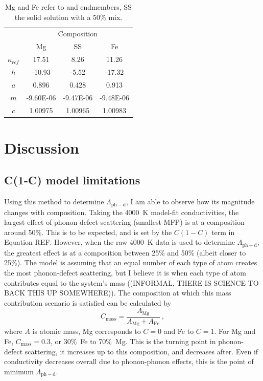 \begin{table}[h]
\centering
\caption[CONTENTS BIT]{\label{tab:comp-table}Mg and Fe refer to \mgsios and \fesios endmembers, SS the solid solution with a 50\% mix.}
\begin{tabular}{c|ccc}
                           & \multicolumn{3}{c}{Composition}    \\
                           & Mg             & SS           & Fe           \\ \hline
$\kappa_{ref}$  & 17.51         & 8.26        & 11.26      \\
$h$                     & -10.93        & -5.52       & -17.32     \\
$a$                     & 0.896         & 0.428       & 0.913     \\
$m$                    & -9.60E-06  & -9.47E-06 & -9.48E-06 \\
$c$                      & 1.00975    & 1.00965    & 1.00983
\end{tabular}
\end{table}







\section{Discussion} 

\subsection{C(1-C) model limitations}

Using this method to determine $\Lambda_{\mathrm{ph-d}}$, I am able to observe how its magnitude changes with composition. Taking the 4000~K model-fit conductivities, the largest effect of phonon-defect scattering (smallest MFP) is at a composition around 50\%. This is to be expected, and is set by the $C \left (1-C \right)$ term in Equation REF. However, when the raw 4000~K data is used to determine $\Lambda_{\mathrm{ph-d}}$, the greatest effect is at a composition between 25\% and 50\% (albeit closer to 25\%). The model is assuming that an equal number of each type of atom creates the most phonon-defect scattering, but I believe it is when each type of atom contributes equal to the system's mass ((INFORMAL, THERE IS SCIENCE TO BACK THIS UP SOMEWHERE)). The composition at which this mass contribution scenario is satisfied can be calculated by
%
$$ C_{\mathrm{mass}} = \frac{A_{\mathrm{Mg}}}{A_{\mathrm{Mg}} + A_{\mathrm{Fe}}}\ ,$$
%
where $A$ is atomic mass, Mg corresponds to $C=0$ and Fe to $C=1$. For Mg and Fe, $C_{\mathrm{mass}} = 0.3$, or 30\%~Fe to 70\%~Mg. This is the turning point in phonon-defect scattering, it increases up to this composition, and decreases after. Even if conductivity decreases overall due to phonon-phonon effects, this is the point of minimum $\Lambda_{\mathrm{ph-d}}$.

